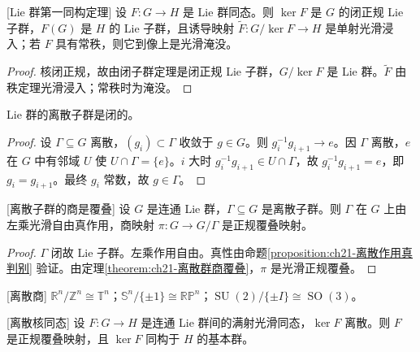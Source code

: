 \documentclass[../../main.tex]{subfiles}
\begin{document}
\begin{theorem}{[Lie 群第一同构定理]}\label{theorem:ch21-Lie群第一同构}
设 $F\colon G\to H$ 是 Lie 群同态。则 $\ker F$ 是 $G$ 的闭正规 Lie 子群，$F(G)$ 是 $H$ 的 Lie 子群，且诱导映射 $\widetilde F\colon G/\ker F\to H$ 是单射光滑浸入；若 $F$ 具有常秩，则它到像上是光滑淹没。
\end{theorem}

\begin{proof}
核闭正规，故由闭子群定理是闭正规 Lie 子群，$G/\ker F$ 是 Lie 群。$\widetilde F$ 由秩定理光滑浸入；常秩时为淹没。
\end{proof}

\begin{proposition}\label{proposition:ch21-离散子群闭}
Lie 群的离散子群是闭的。
\end{proposition}

\begin{proof}
设 $\Gamma\subseteq G$ 离散，$(g_i)\subset\Gamma$ 收敛于 $g\in G$。则 $g_i^{-1}g_{i+1}\to e$。因 $\Gamma$ 离散，$e$ 在 $G$ 中有邻域 $U$ 使 $U\cap\Gamma=\{e\}$。$i$ 大时 $g_i^{-1}g_{i+1}\in U\cap\Gamma$，故 $g_i^{-1}g_{i+1}=e$，即 $g_i=g_{i+1}$。最终 $g_i$ 常数，故 $g\in\Gamma$。
\end{proof}

\begin{theorem}{[离散子群的商是覆叠]}\label{theorem:ch21-离散子群商覆叠}
设 $G$ 是连通 Lie 群，$\Gamma\subseteq G$ 是离散子群。则 $\Gamma$ 在 $G$ 上由左乘光滑自由真作用，商映射 $\pi\colon G\to G/\Gamma$ 是正规覆叠映射。
\end{theorem}

\begin{proof}
$\Gamma$ 闭故 Lie 子群。左乘作用自由。真性由命题\cref{proposition:ch21-离散作用真判别} 验证。由定理\cref{theorem:ch21-离散群商覆叠}，$\pi$ 是光滑正规覆叠。
\end{proof}

\begin{example}{[离散商]}\label{example:ch21-离散商}
$\mathbb{R}^n/\mathbb{Z}^n\cong\mathbb{T}^n$；$\mathbb{S}^n/\{\pm1\}\cong\mathbb{RP}^n$；$\operatorname{SU}(2)/\{\pm I\}\cong\operatorname{SO}(3)$。
\end{example}

\begin{theorem}{[离散核同态]}\label{theorem:ch21-离散核同态}
设 $F\colon G\to H$ 是连通 Lie 群间的满射光滑同态，$\ker F$ 离散。则 $F$ 是正规覆叠映射，且 $\ker F$ 同构于 $H$ 的基本群。
\end{theorem}
\end{document}
